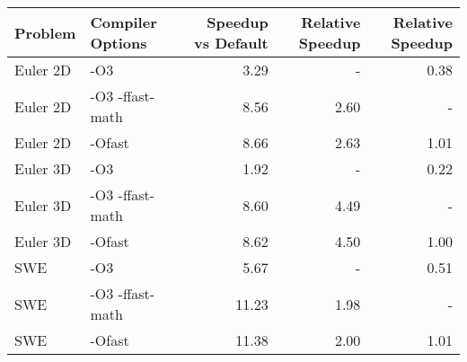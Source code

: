 \begin{tabular}{llrrr}
\toprule
Problem & Compiler Options & Speedup vs Default & Relative Speedup & Relative Speedup \\
\midrule
Euler 2D & -O3 & 3.29 & - & 0.38 \\
Euler 2D & -O3 -ffast-math & 8.56 & 2.60 & - \\
Euler 2D & -Ofast & 8.66 & 2.63 & 1.01 \\
Euler 3D & -O3 & 1.92 & - & 0.22 \\
Euler 3D & -O3 -ffast-math & 8.60 & 4.49 & - \\
Euler 3D & -Ofast & 8.62 & 4.50 & 1.00 \\
SWE & -O3 & 5.67 & - & 0.51 \\
SWE & -O3 -ffast-math & 11.23 & 1.98 & - \\
SWE & -Ofast & 11.38 & 2.00 & 1.01 \\
\bottomrule
\end{tabular}
